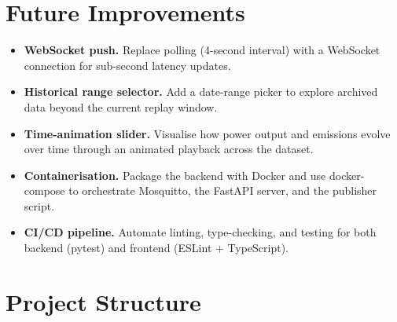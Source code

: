 \documentclass[11pt,a4paper]{article}
\begin{document}


\section{Future Improvements}

\begin{itemize}
    \item \textbf{WebSocket push.} Replace polling (4-second interval) with a WebSocket connection for sub-second latency updates.
    \item \textbf{Historical range selector.} Add a date-range picker to explore archived data beyond the current replay window.
    \item \textbf{Time-animation slider.} Visualise how power output and emissions evolve over time through an animated playback across the dataset.
    \item \textbf{Containerisation.} Package the backend with Docker and use docker-compose to orchestrate Mosquitto, the FastAPI server, and the publisher script.
    \item \textbf{CI/CD pipeline.} Automate linting, type-checking, and testing for both backend (pytest) and frontend (ESLint + TypeScript).
\end{itemize}

\appendix

\section{Project Structure}
\end{document}
